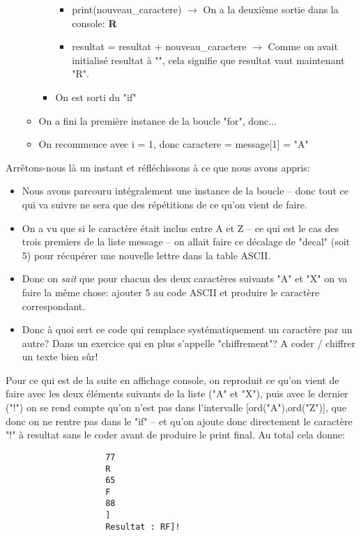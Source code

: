 \documentclass[11pt,a4paper]{exam}
\begin{document}
\begin{questions}
\begin{spacing}{1}
\begin{solution}
\begin{itemize}
\begin{itemize}
\begin{itemize}
\begin{itemize}
								\item print(nouveau\_caractere) $\rightarrow$ On a la deuxième sortie dans la console: \textbf{R}
								\item resultat = resultat + nouveau\_caractere $\rightarrow$ Comme on avait initialisé resultat à "", cela signifie que resultat vaut maintenant "R".
							\end{itemize}
							\item On est sorti du "if"
						\end{itemize}
						\item On a fini la première instance de la boucle "for", donc...
						\item On recommence avec i = 1, donc caractere = message[1] = "A"
					\end{itemize}
				\end{itemize}
				
				Arrêtons-nous là un instant et réfléchissons à ce que nous avons appris:
				\begin{itemize}
					\item Nous avons parcouru intégralement une instance de la boucle -- donc tout ce qui va suivre ne sera que des répétitions de ce qu'on vient de faire.
					\item On a vu que si le caractère était inclus entre A et Z -- ce qui est le cas des trois premiers de la liste message -- on allait faire ce décalage de "decal" (soit 5) pour récupérer une nouvelle lettre dans la table ASCII.
					\item Donc on \textit{sait} que pour chacun des deux caractères suivants "A" et "X" on va faire la même chose: ajouter 5 au code ASCII et produire le caractère correspondant.
					\item Donc à quoi sert ce code qui remplace systématiquement un caractère par un autre? Dans un exercice qui en plus s'appelle "chiffrement"? A coder / chiffrer un texte bien sûr!
				\end{itemize}
				
				Pour ce qui est de la suite en affichage console, on reproduit ce qu'on vient de faire avec les deux éléments suivants de la liste ("A" et "X"), puis avec le dernier ("!") on se rend compte qu'on n'est pas dans l'intervalle [ord("A"),ord("Z")], que donc on ne rentre pas dans le "if" -- et qu'on ajoute donc directement le caractère "!" à resultat sans le coder avant de produire le print final. Au total cela donne:
				\begin{verbatim}
					77
					R
					65
					F
					88
					]
					Resultat : RF]!
				\end{verbatim}
				

\end{solution}
\end{spacing}
\end{questions}
\end{document}
